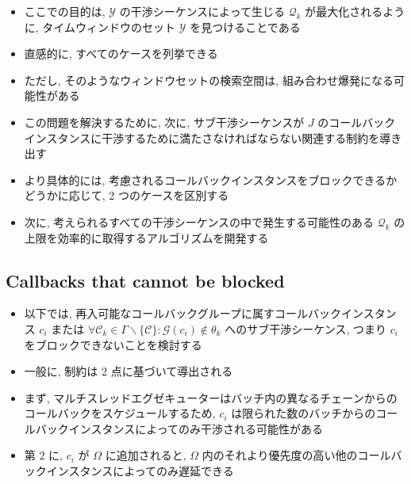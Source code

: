\begin{frame}{}
    \begin{itemize}
        \item ここでの目的は, $\mathcal{Y}$ の干渉シーケンスによって生じる $\mathcal{Q}_{k}$ が最大化されるように, タイムウィンドウのセット $\mathcal{Y}$ を見つけることである
        \item 直感的に, すべてのケースを列挙できる
        \item ただし, そのようなウィンドウセットの検索空間は, 組み合わせ爆発になる可能性がある
        \item この問題を解決するために, 次に, サブ干渉シーケンスが $J$ のコールバックインスタンスに干渉するために満たさなければならない関連する制約を導き出す
        \item より具体的には, 考慮されるコールバックインスタンスをブロックできるかどうかに応じて, 2 つのケースを区別する
        \item 次に, 考えられるすべての干渉シーケンスの中で発生する可能性のある $\mathcal{Q}_{k}$ の上限を効率的に取得するアルゴリズムを開発する
    \end{itemize}
\end{frame}


\subsection{Callbacks that cannot be blocked}
\label{ssec: callbacks_that_cannot_be_blocked}

\begin{frame}{}
    \begin{itemize}
        \item 以下では, 再入可能なコールバックグループに属すコールバックインスタンス $c_{i}$ または $\forall \mathcal{C}_{k} \in \Gamma \backslash\{\mathcal{C}\}: \mathcal{G}\left(c_{i}\right) \notin \theta_{k}$ へのサブ干渉シーケンス, つまり $c_{i}$ をブロックできないことを検討する
        \item 一般に, 制約は 2 点に基づいて導出される
        \item まず, マルチスレッドエグゼキューターはバッチ内の異なるチェーンからのコールバックをスケジュールするため, $c_{i}$ は限られた数のバッチからのコールバックインスタンスによってのみ干渉される可能性がある
        \item 第 2 に, $c_{i}$ が $\Omega$ に追加されると, $\Omega$ 内のそれより優先度の高い他のコールバックインスタンスによってのみ遅延できる
    \end{itemize}
\end{frame}

